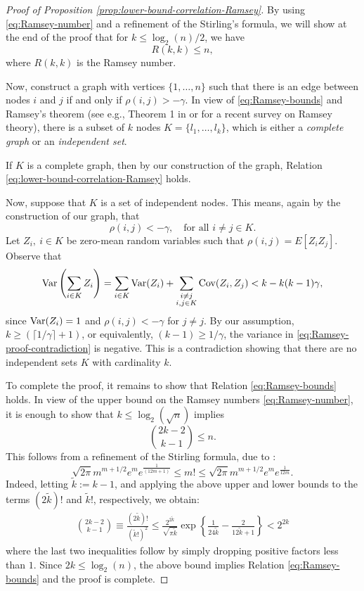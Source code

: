 \begin{proof}[Proof of Proposition \ref{prop:lower-bound-correlation-Ramsey}]
By using \eqref{eq:Ramsey-number} and a refinement of the Stirling's formula, 
we will show at the end of the proof that for $k \le \log_2({n})/2$, we have 
\begin{equation}\label{eq:Ramsey-bounds}
 R(k,k) \le n,
\end{equation}
where $R(k,k)$ is the Ramsey number.  

Now, construct a graph with vertices $\{1,\dots,n\}$ such that there is an edge between nodes $i$ and $j$ if and only if $\rho(i,j) > -\gamma$. 
In view of \eqref{eq:Ramsey-bounds} and Ramsey's theorem (see e.g., Theorem 1 in \cite{fox2009lecture} or \cite{conlon2015recent} for a recent survey on Ramsey theory), there is a subset of $k$ nodes $K =\{l_1,\dots,l_k\}$, which is either a {\em complete graph} or an {\em independent set}.

If $K$ is a complete graph, then by our construction of the graph, Relation \eqref{eq:lower-bound-correlation-Ramsey} holds. 

Now, suppose that $K$ is a set of independent nodes.  This means, again by the construction of our graph, that
$$
\rho(i,j) < -\gamma,\quad\mbox{for all }i\not= j\in K.
$$
Let $Z_i,\ i \in K$ be zero-mean random variables such that 
$\rho(i,j) = E [Z_iZ_j]$. Observe that
\begin{equation} \label{eq:Ramsey-proof-contradiction}
    \var\left( \sum_{i\in K} Z_i\right) 
    = \sum_{i\in K} \var(Z_i) + \sum_{\substack{i\not=j\\i,j \in K}} \cov(Z_i, Z_j) 
    <  k - k(k-1)\gamma,
\end{equation}
since ${\rm {Var}}(Z_i)=1$ and $\rho(i,j)<-\gamma$ for $j\neq j$.
By our assumption, $k\ge \left(\lceil 1/\gamma \rceil + 1\right)$, or equivalently, $(k-1) \ge 1/\gamma$, the variance in \eqref{eq:Ramsey-proof-contradiction} is negative. 
This is a contradiction showing that there are no independent sets $K$ with cardinality $k$.

To complete the proof, it remains to show that Relation \eqref{eq:Ramsey-bounds} holds.
In view of the upper bound on the Ramsey numbers \eqref{eq:Ramsey-number}, it 
is enough to show that $k \le \log_2(\sqrt{n})$ implies
$$
 { 2 k - 2 \choose k-1 } \le n.
$$
This follows from a refinement of the Stirling formula, due to \citet{robbins1955remark}:
$$
 \sqrt{2\pi} m^{m+1/2} e^{m} e^{\frac{1}{(12 m +1)}} \le  m! \le \sqrt{2\pi} m^{m+1/2} e^{m} 
 e^{\frac{1}{12 m}}.
$$
Indeed, letting $\widetilde k:= k-1$, and applying the above upper and lower bounds 
to the  terms $(2\widetilde k)!$ and $\widetilde k!$, respectively, we obtain:
\begin{align*}
{ 2 k - 2 \choose k-1 } \equiv \frac{(2\widetilde k)!}{ (\widetilde k!)^2 }
\le \frac{2^{2\widetilde k}}{\sqrt{\pi \widetilde k}}\exp\left \{ \frac{1}{24 \widetilde k} -
\frac{2}{ 12 \widetilde k +1}\right\} < 2^{2 k}
\end{align*}
where the last two inequalities follow by simply dropping positive factors less than $1$.
Since $2k \le \log_2(n)$, the above bound implies Relation \eqref{eq:Ramsey-bounds} 
and the proof is complete.
\end{proof}

